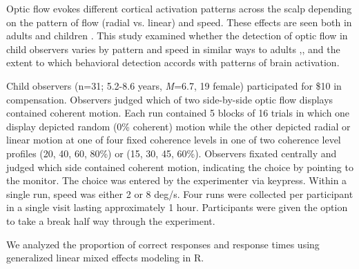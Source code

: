 \documentclass[landscape,final,paperwidth=60in,paperheight=41.5in,fontscale=0.285]{baposter}
\begin{document}
\begin{poster}
%
    {
      Optic flow evokes different cortical activation patterns across the scalp depending on the pattern of flow (radial vs. linear) and speed. These effects are seen both in adults \cite{Fesi2014-pi} and children \cite{Gilmore2016-sd}. This study examined whether the detection of optic flow in child observers varies by pattern and speed in similar ways to adults \cite{Adamiak2015-lo},\cite{Adamiak2015-tw}, and the extent to which behavioral detection accords with patterns of brain activation.
    }
    {
Child observers (n=31; 5.2-8.6 years, \emph{M}=6.7, 19 female) participated for \$10 in compensation. Observers judged which of two side-by-side optic flow displays contained coherent motion. Each run contained 5 blocks of 16 trials in which one display depicted random (0\% coherent) motion while the other depicted radial or linear motion at one of four fixed coherence levels in one of two coherence level profiles (20, 40, 60, 80\%) or (15, 30, 45, 60\%). Observers fixated centrally and judged which side contained coherent motion, indicating the choice by pointing to the monitor. The choice was entered by the experimenter via keypress. Within a single run, speed was either 2 or 8 deg/s. Four runs were collected per participant in a single visit lasting approximately 1 hour. Participants were given the option to take a break half way through the experiment. 
\par
We analyzed the proportion of correct responses and response times using generalized linear mixed effects modeling in R.
}
\end{poster}
\end{document}
